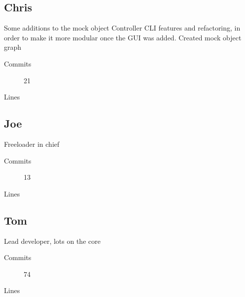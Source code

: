   \subsection{Chris}
    Some additions to the mock object
    Controller
    CLI features and refactoring, in order to make it more modular once the GUI was added.
    Created mock object graph
    
    \begin{description}
      \item[Commits] 21
      \item[Lines]
    \end{description}

  \subsection{Joe}
    Freeloader in chief
    \begin{description}
      \item[Commits] 13
      \item[Lines]
    \end{description}

  \subsection{Tom}
    Lead developer, lots on the core
    \begin{description}
      \item[Commits] 74
      \item[Lines]
    \end{description}
